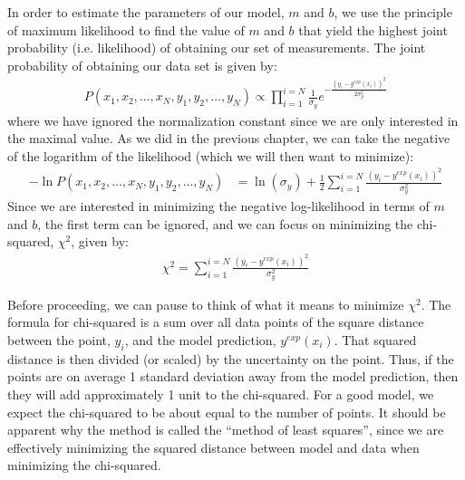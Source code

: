 In order to estimate the parameters of our model, $m$ and $b$, we use the principle of maximum likelihood to find the value of $m$ and $b$ that yield the highest joint probability (i.e. likelihood) of obtaining our set of measurements. The joint probability of obtaining our data set is given by:
\begin{align*}
P(x_1,x_2,\dots,x_N,y_1,y_2,\dots,y_N)\propto\prod_{i=1}^{i=N}\frac{1}{\sigma_{y}}e^{-\frac{(y_i-y^{exp}(x_i))^2}{2\sigma_{y}^2}}
\end{align*}
where we have ignored the normalization constant since we are only interested in the maximal value. As we did in the previous chapter, we can take the negative of the logarithm of the likelihood (which we will then want to minimize):
\begin{align}
-\ln{P(x_1,x_2,\dots,x_N,y_1,y_2,\dots,y_N)}&=\ln(\sigma_y)+\frac{1}{2}\sum_{i=1}^{i=N}\frac{(y_i-y^{exp}(x_i))^2}{\sigma_{y}^2}
\end{align}
Since we are interested in minimizing the negative log-likelihood in terms of $m$ and $b$, the first term can be ignored, and we can focus on minimizing the chi-squared, $\chi^2$, given by:
\begin{align}
\chi^2=\sum_{i=1}^{i=N}\frac{(y_i-y^{exp}(x_i))^2}{\sigma_{y}^2}
\end{align}

Before proceeding, we can pause to think of what it means to minimize $\chi^2$. The formula for chi-squared is a sum over all data points of the square distance between the point, $y_i$, and the model prediction, $y^{exp}(x_i)$. That squared distance is then divided (or scaled) by the uncertainty on the point. Thus, if the points are on average 1 standard deviation away from the model prediction, then they will add approximately 1 unit to the chi-squared. For a good model, we expect the chi-squared to be about equal to the number of points. It should be apparent why the method is called the ``method of least squares'', since we are effectively minimizing the squared distance between model and data when minimizing the chi-squared.


